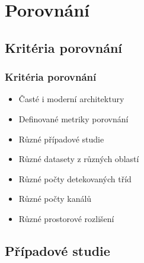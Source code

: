 \documentclass[10pt, t]{beamer}
\begin{document}

\section{Porovnání}


\subsection{Kritéria porovnání}


\begin{frame}

\frametitle{Kritéria porovnání}

\begin{itemize}
	\item Časté i moderní architektury
	\item Definované metriky porovnání
	\item Různé případové studie
	\item Různé datasety z různých oblastí
	\item Různé počty detekovaných tříd
	\item Různé počty kanálů
	\item Různé prostorové rozlišení
\end{itemize}

\end{frame}


\subsection{Případové studie}

\end{document}
